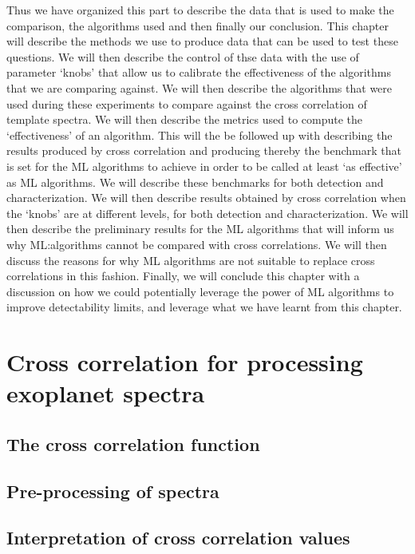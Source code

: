 Thus we have organized this part to describe the data that is used to make the comparison, the algorithms used and then finally our conclusion.
This chapter will describe the methods we use to produce data that can be used to test these questions.
We will then describe the control of thse data with the use of parameter `knobs' that allow us to calibrate the effectiveness of the algorithms that we are comparing against.
We will then describe the algorithms that were used during these experiments to compare against the cross correlation of template spectra. 
We will then describe the metrics used to compute the `effectiveness' of an algorithm.
This will the be followed up with describing the results produced by cross correlation and producing thereby the benchmark that is set for the ML algorithms to achieve in order to be called at least `as effective' as ML algorithms.
We will describe these benchmarks for both detection and characterization.
We will then describe results obtained by  cross correlation when the `knobs' are at different levels, for both detection and characterization.
We will then describe the preliminary results for the ML algorithms that will inform us why ML:algorithms cannot be compared with cross correlations.
We will then discuss the reasons for why ML algorithms are not suitable to replace cross correlations in this fashion.
Finally, we will conclude this chapter with a discussion on how we could potentially leverage the power of ML algorithms to improve detectability limits, and leverage what we have learnt from this chapter.

\chapter{Cross correlation for processing exoplanet spectra}
\section{The cross correlation function}
\section{Pre-processing of spectra}
\section{Interpretation of cross correlation values}

